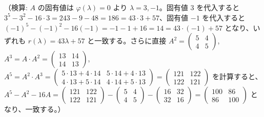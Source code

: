 （検算: $A$ の固有値は $\varphi(\lambda)=0$ より $\lambda = 3, -1$。固有値 $3$ を代入すると $3^{5} - 3^{2} - 16\cdot 3 = 243 - 9 - 48 = 186 = 43\cdot 3 + 57$、固有値 $-1$ を代入すると $(-1)^{5} - (-1)^{2} - 16(-1) = -1 - 1 + 16 = 14 = 43\cdot(-1)+57$ となり、いずれも $r(\lambda) = 43\lambda+57$ と一致する。さらに直接 $A^{2} = \begin{pmatrix}5&4\\4&5\end{pmatrix}$, $A^{3}=A\cdot A^2=\begin{pmatrix}13&14\\14&13\end{pmatrix}$, $A^{5}=A^{2}\cdot A^{3}=\begin{pmatrix}5\cdot13+4\cdot14 & 5\cdot14+4\cdot13\\ 4\cdot13+5\cdot14 & 4\cdot14+5\cdot13\end{pmatrix}=\begin{pmatrix}121&122\\122&121\end{pmatrix}$ を計算すると、$A^{5}-A^{2}-16A = \begin{pmatrix}121&122\\122&121\end{pmatrix} - \begin{pmatrix}5&4\\4&5\end{pmatrix} - \begin{pmatrix}16&32\\32&16\end{pmatrix} = \begin{pmatrix}100&86\\86&100\end{pmatrix}$ となり、一致する。）
